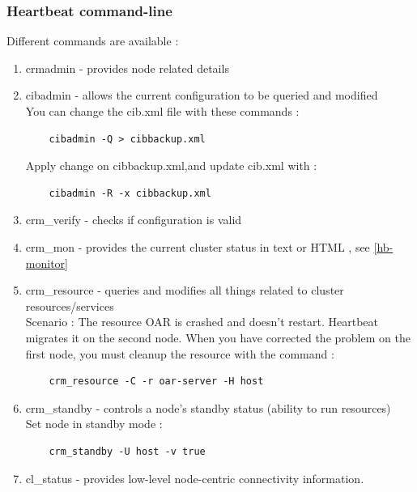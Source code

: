 \documentclass[a4paper,10pt]{report}
\begin{document}
\subsubsection{Heartbeat command-line}
\label{hb-command}
Different commands are available : 
\begin{enumerate}
 \item crmadmin - provides node related details 
 \item cibadmin - allows the current configuration to be queried and modified \\
    You can change the cib.xml file with these commands :
    \begin{lstlisting}
    cibadmin -Q > cibbackup.xml 
    \end{lstlisting}
  Apply change on cibbackup.xml,and update cib.xml with :
    \begin{lstlisting}
    cibadmin -R -x cibbackup.xml 
    \end{lstlisting}

 \item crm\_verify - checks if configuration is valid 
 \item crm\_mon - provides the current cluster status in text or HTML , see \ref{hb-monitor}
 \item crm\_resource - queries and modifies all things related to cluster resources/services\\
    Scenario : The resource OAR is crashed and doesn't restart. Heartbeat migrates it on the second node. When you have corrected the problem on the first node, you must cleanup the resource with the command :
    \begin{lstlisting}
    crm_resource -C -r oar-server -H host
    \end{lstlisting}
 \item crm\_standby - controls a node's standby status (ability to run resources) \\
    Set node in standby mode :
    \begin{lstlisting}
    crm_standby -U host -v true 
    \end{lstlisting}
 \item cl\_status - provides low-level node-centric connectivity information. 
\end{enumerate}
\end{document}
